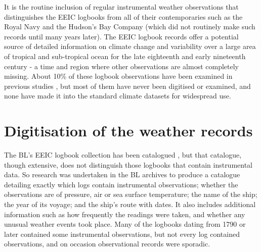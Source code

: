 \documentclass[CP]{copernicus}
\begin{document}
It is the routine inclusion of regular instrumental weather observations that distinguishes the EEIC logbooks from all of their contemporaries such as the Royal Navy and the Hudson's Bay Company (which did not routinely make such records until many years later). The EEIC logbook records offer a potential source of detailed information on climate change and variability over a large area of tropical and sub-tropical ocean for the late eighteenth and early nineteenth century - a time and region where other observations are almost completely missing. About 10\% of these logbook observations have been examined in previous studies \citep{chenoweth96,farrington98,chenoweth00homogenization}, but most of them have never been digitised or examined, and none have made it into the standard climate datasets for widespread use.

\section{Digitisation of the weather records}

The BL's EEIC logbook collection has been catalogued \citep{Farrington99}, but that catalogue, though extensive, does not distinguish those logbooks that contain instrumental data. So research was undertaken in the BL archives to produce a catalogue detailing exactly which logs contain instrumental observations; whether the observations are of pressure, air or sea surface temperature; the name of the ship; the year of its voyage; and the ship's route with dates. It also includes additional information such as how frequently the readings were taken, and whether any unusual weather events took place. Many of the logbooks dating from 1790 or later contained some instrumental observations, but not every log contained observations, and on occasion observational records were sporadic.
\end{document}

